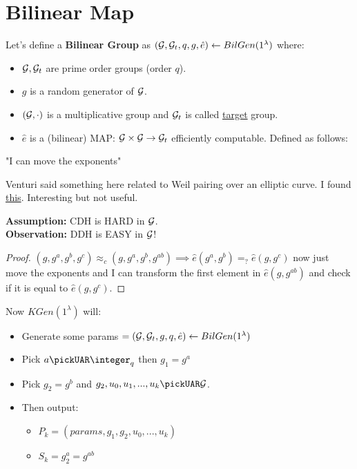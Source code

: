 \section{Bilinear Map}
Let's define a \textbf{Bilinear Group} as $(\mathcal{G}, \mathcal{G}_t, q, g, \hat{e})\leftarrow BilGen(1^{\lambda})$ where:
\begin{itemize}
    \item $\mathcal{G}, \mathcal{G}_t$ are prime order groups (order $q$).
    \item $g$ is a random generator of $\mathcal{G}$.
    \item $(\mathcal{G}, \cdot)$ is a multiplicative group and $\mathcal{G}_t$ is called \underline{target} group.
    \item $\hat{e}$ is a (bilinear) MAP: $\mathcal{G} \times \mathcal{G} \rightarrow \mathcal{G}_t$ efficiently computable. Defined as follows:
    
\end{itemize}
"I can move the exponents"

Venturi said something here related to Weil pairing over an elliptic curve. I found \href{https://www.math.auckland.ac.nz/~sgal018/crypto-book/ch26.pdf}{this}. Interesting but not useful.
 
\noindent\textbf{Assumption:} CDH is HARD in $\mathcal{G}$.\\
\textbf{Observation:} DDH is EASY in $\mathcal{G}$!
\begin{proof}
    $(g,g^a,g^b,g^c)\approx_c (g,g^a,g^b,g^{ab}) \implies \hat{e}(g^a,g^b)=_?\hat{e}(g,g^c)$ now just move the exponents and I can transform the first element in $\hat{e}(g,g^{ab})$ and check if it is equal to $\hat{e}(g,g^c)$.
\end{proof}

Now $KGen(1^{\lambda})$ will:
\begin{itemize}
    \item Generate some params $ =(\mathcal{G},\mathcal{G}_t,g,q,\hat{e})\leftarrow BilGen(1^{\lambda})$ 
    \item Pick $a \pickUAR \integer_q$ then $g_1=g^a$
    \item Pick $g_2=g^b$ and $g_2,u_0,u_1,...,u_k \pickUAR \G$.
    \item Then output: 
    \begin{itemize}
        \item $P_k=(params, g_1,g_2,u_0,...,u_k)$
        \item $S_k=g_2^a=g^{ab}$
    \end{itemize}
\end{itemize}

